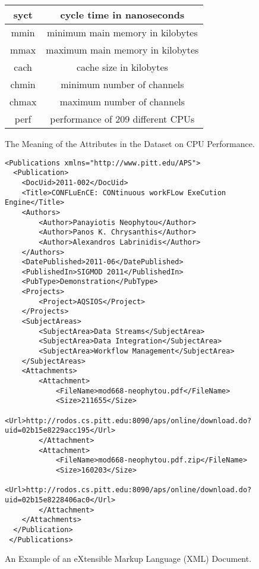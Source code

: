 \documentclass[12pt]{article}
\begin{document}
\begin{enumerate}
\begin{figure}[h]
\begin{tabular}{c | c}
    syct & cycle time in nanoseconds \\ \hline

    mmin & minimum main memory in kilobytes \\ \hline

    mmax & maximum main memory in kilobytes \\ \hline

    cach & cache size in kilobytes \\ \hline

    chmin & minimum number of channels \\ \hline

    chmax & maximum number of channels \\ \hline

    perf & performance of 209 different CPUs

  \end{tabular} 
  \caption{The Meaning of the Attributes in the Dataset on CPU Performance.}

\end{figure}


\end{enumerate}

\begin{figure}[p]

\vspace*{-.5in}

\centering

{\footnotesize 
\begin{verbatim}
<Publications xmlns="http://www.pitt.edu/APS">
  <Publication>
    <DocUid>2011-002</DocUid>
    <Title>CONFLuEnCE: CONtinuous workFLow ExeCution Engine</Title>
    <Authors>
        <Author>Panayiotis Neophytou</Author>
        <Author>Panos K. Chrysanthis</Author>
        <Author>Alexandros Labrinidis</Author>
    </Authors>
    <DatePublished>2011-06</DatePublished>
    <PublishedIn>SIGMOD 2011</PublishedIn>
    <PubType>Demonstration</PubType>
    <Projects>
        <Project>AQSIOS</Project>
    </Projects>
    <SubjectAreas>
        <SubjectArea>Data Streams</SubjectArea>
        <SubjectArea>Data Integration</SubjectArea>
        <SubjectArea>Workflow Management</SubjectArea>
    </SubjectAreas>
    <Attachments>
        <Attachment>
            <FileName>mod668-neophytou.pdf</FileName>
            <Size>211655</Size>
            <Url>http://rodos.cs.pitt.edu:8090/aps/online/download.do?uid=02b15e8229acc195</Url>
        </Attachment>
        <Attachment>
            <FileName>mod668-neophytou.pdf.zip</FileName>
            <Size>160203</Size>
            <Url>http://rodos.cs.pitt.edu:8090/aps/online/download.do?uid=02b15e8228406ac0</Url>
        </Attachment>
    </Attachments>
  </Publication>
 </Publications>
\end{verbatim} }

\caption{An Example of an eXtensible Markup Language (XML) Document.}
\label{figure:xml}
\end{figure}
\end{document}
